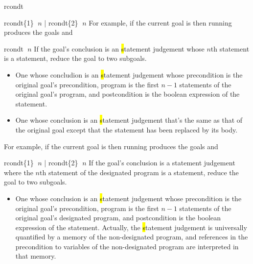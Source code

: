 \begin{tactic}{rcondt}
\begin{tsyntax}{rcondt\{1\} $\;n$ | rcondt\{2\} $\;n$}
  \medskip
  For example, if the current goal is
   then
  running 
  produces the goals
  and
  \end{tsyntax}

  \begin{tsyntax}{rcondt $\;n$}
    If the goal's conclusion is an \hl statement judgement whose $n$th
    statement is a  statement, reduce the goal to two
    subgoals.
    \begin{itemize}
    \item One whose concludion is an \hl statement judgement whose
      precondition is the original goal's precondition, program is the
      first $n-1$ statements of the original goal's program, and
      postcondition is the boolean expression of the 
      statement.
   
    \item One whose conclusion is an \hl statement judgement that's
      the same as that of the original goal except that the 
      statement has been replaced by its body.
    \end{itemize}

    \medskip For example, if the current goal is
     then
    running 
    produces the goals
     and
  \end{tsyntax}

  \begin{tsyntax}{rcondt\{1\} $\;n$ | rcondt\{2\} $\;n$}
    If the goal's conclusion is a \prhl statement judgement where the
    $n$th statement of the designated program is a  statement,
    reduce the goal to two subgoals.
    \begin{itemize}
    \item One whose conclusion is an \hl statement judgement whose
      precondition is the original goal's precondition, program is the
      first $n-1$ statements of the original goal's designated
      program, and postcondition is the boolean expression of the
       statement. Actually, the \hl statement judgement is
      universally quantified by a memory of the non-designated
      program, and references in the precondition to variables of the
      non-designated program are interpreted in that memory.
   

\end{itemize}
\end{tsyntax}
\end{tactic}
